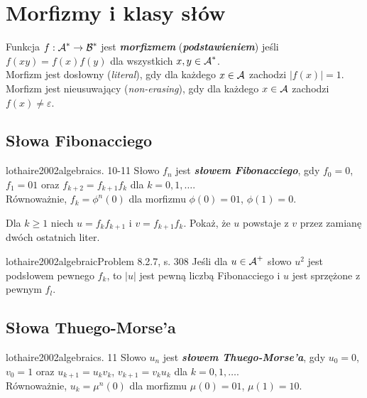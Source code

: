 \section{Morfizmy i klasy słów}

\begin{definition}{}{}
  Funkcja $f: \operatorname{\mathcal{A}}^* \to \operatorname{\mathcal{B}}^*$ jest \textbf{\textit{morfizmem}} (\textbf{\textit{podstawieniem}}) jeśli $f(xy) = f(x)f(y)$ dla wszystkich $x, y \in \operatorname{\mathcal{A}}^*$.
  \\
  Morfizm jest dosłowny (\emph{literal}), gdy dla każdego $x \in \operatorname{\mathcal{A}}$ zachodzi $|f(x)| = 1$.
  \\
  Morfizm jest nieusuwający (\emph{non-erasing}), gdy dla każdego $x \in \operatorname{\mathcal{A}}$ zachodzi $f(x) \neq \varepsilon$.
\end{definition}

\subsection{Słowa Fibonacciego}

\begin{definition}{lothaire2002algebraic}{s. 10-11}
  Słowo $f_n$ jest \textbf{\textit{słowem Fibonacciego}}, gdy $f_0 = 0$, $f_1 = 01$ oraz $f_{k + 2} = f_{k + 1} f_k$ dla $k = 0, 1, \ldots$.
  \\
  Równoważnie, $f_k = \phi^n(0)$ dla morfizmu $\phi(0) = 01$, $\phi(1) = 0$.
\end{definition}

\begin{problem}{}{}
  Dla $k \ge 1$ niech $u = f_k f_{k + 1}$ i $v = f_{k + 1} f_k$. Pokaż, że $u$ powstaje z $v$ przez zamianę dwóch ostatnich liter.
\end{problem}

\begin{problem}{lothaire2002algebraic}{Problem 8.2.7, s. 308}
  Jeśli dla $u \in \operatorname{\mathcal{A}}^+$ słowo $u^2$ jest podsłowem pewnego $f_k$, to $|u|$ jest pewną liczbą Fibonacciego i $u$ jest sprzężone z pewnym $f_l$.
\end{problem}

\subsection{Słowa Thuego-Morse'a}

\begin{definition}{lothaire2002algebraic}{s. 11}
  Słowo $u_n$ jest \textbf{\textit{słowem Thuego-Morse'a}}, gdy $u_0 = 0$, $v_0 = 1$ oraz $u_{k + 1} = u_k v_k$, $v_{k + 1} = v_k u_k$ dla $k = 0, 1, \ldots$.
  \\
  Równoważnie, $u_k = \mu^n(0)$ dla morfizmu $\mu(0) = 01$, $\mu(1) = 10$.
\end{definition}


